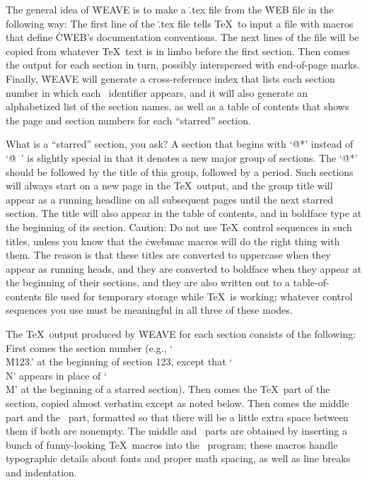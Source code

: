 The general idea of \.{WEAVE} is to make a \.{.tex} file from the \.{WEB}
file in the following way: The first line of the \.{.tex} file
tells \TeX\ to input a file with macros that
define \.{CWEB}'s documentation conventions. The next lines of the file
will be copied from whatever \TeX\ text is in limbo before the first
section.  Then comes the output for each section in turn, possibly
interspersed with end-of-page marks.  Finally, \.{WEAVE} will generate a
cross-reference index that lists each section number in which each \Cee\
identifier appears, and it will also generate an alphabetized list
of the section names, as well as a table of contents that
shows the page and section numbers for each ``starred'' section.

What is a ``starred'' section, you ask? A section that begins with `\.{@*}'
instead of `\.{@\ }' is slightly special in that it denotes a new major
group of sections. The `\.{@*}' should be followed by the title of this
group, followed by a period. Such sections will always start on a new page
in the \TeX\ output, and the group title will appear as a running headline
on all subsequent pages until the next starred section. The title will also
appear in the table of contents, and in boldface type at the beginning of
its section. Caution:  Do not use \TeX\ control sequences in such titles,
unless you know that the \.{cwebmac} macros will do the right thing with
them. The reason is that these titles are converted to uppercase when
they appear as running heads, and they are converted to boldface when they
appear at the beginning of their sections, and they are also written out to
a table-of-contents file used for temporary storage while \TeX\ is
working; whatever control sequences you use must be meaningful in all
three of these modes.

The \TeX\ output produced by \.{WEAVE} for each section consists of
the following: First comes the section number (e.g., `\.{\\M123.}'
at the beginning of section 123, except that `\.{\\N}' appears in place of
`\.{\\M}' at the beginning of a starred section). Then comes the
\TeX\ part of the section, copied almost verbatim except as noted
below. Then comes the middle part and the \Cee\ part, formatted
so that there will be a little extra space between them if both are
nonempty. The middle and \Cee\ parts are obtained by inserting
a bunch of funny-looking \TeX\ macros into the \Cee\ program; these
macros handle typographic details about fonts and proper math spacing,
as well as line breaks and indentation.


